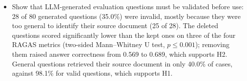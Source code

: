 \documentclass[bdcc,article,submit,pdftex,moreauthors]{Definitions/mdpi}
\begin{document}
\begin{itemize}[labelsep=2.5mm,topsep=-3pt]
\item Show that LLM-generated evaluation questions must be validated before use: 28 of 80 generated questions (35.0\%) were invalid, mostly because they were too general to identify their source document (25 of 28). The deleted questions scored significantly lower than the kept ones on three of the four RAGAS metrics (two-sided Mann--Whitney U test, $p \le 0.001$); removing them raised answer correctness from 0.569 to 0.689, which supports H2. General questions retrieved their source document in only 40.0\% of cases, against 98.1\% for valid questions, which supports H1.

\end{itemize}\vspace{3pt}

\end{document}
